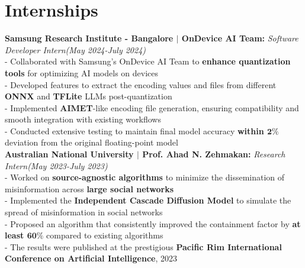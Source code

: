 \documentclass[a4paper,10pt]{article}
\begin{document}
\section{\textbf{Internships}}
\textbf{Samsung Research Institute - Bangalore $\mid$ OnDevice AI Team:} \textit{Software Developer Intern}\hfill\textit{(May 2024-July 2024) }\\
- Collaborated with Samsung’s OnDevice AI Team to \textbf{enhance quantization tools} for optimizing AI models on devices\\
- Developed features to extract the encoding values and files from different \textbf{ONNX} and \textbf{TFLite} LLMs post-quantization\\
- Implemented \textbf{AIMET}-like encoding file generation, ensuring compatibility and smooth integration with existing workflows\\
- Conducted extensive testing to maintain final model accuracy \textbf{within $\textbf{2\%}$} deviation from the original floating-point model\\
\textbf{Australian National University $\mid$ Prof. Ahad N. Zehmakan:} \textit{Research Intern}\hfill\textit{(May 2023-July 2023) } \\
- Worked on \textbf{source-agnostic algorithms} to minimize the dissemination of misinformation across \textbf{large social networks}\\
- Implemented the \textbf{Independent Cascade Diffusion Model} to simulate the spread of misinformation in social networks\\
- Proposed an algorithm that consistently improved the containment factor by \textbf{at least $\textbf{60\%}$} compared to existing algorithms\\
- The results were published at the prestigious \textbf{Pacific Rim International Conference on Artificial Intelligence}, 2023
\end{document}
